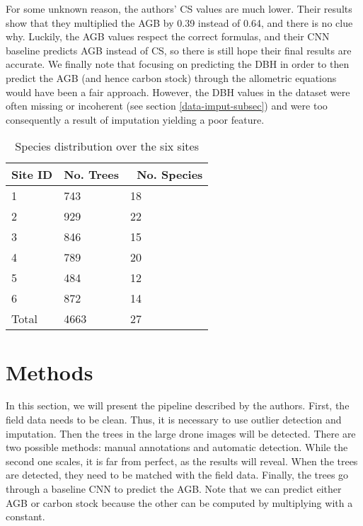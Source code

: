 \documentclass[10pt,twocolumn,letterpaper]{article}
\begin{document}
For some unknown reason, the authors' CS values are much lower. Their results show that they multiplied the AGB by 0.39 instead of 0.64, and there is no clue why. Luckily, the AGB values respect the correct formulas, and their CNN baseline predicts AGB instead of CS, so there is still hope their final results are accurate. We finally note that focusing on predicting the DBH in order to then predict the AGB (and hence carbon stock) through the allometric equations would have been a fair approach. However, the DBH values in the dataset were often missing or incoherent (see section \ref{data-imput-subsec}) and were too consequently a result of imputation yielding a poor feature. 

\begin{table}
    \begin{center}
        \begin{tabular}{P{1cm} | P{1.5cm} | P{1.8cm}}
             Site ID & No. Trees & \ No. Species\\
              & 743 & 18\\
             2 & 929 & 22\\
             3 & 846 & 15\\
             4 & 789 & 20\\
             5 & 484 & 12\\
             6 & 872 & 14\\
             \hline
             Total & 4663 & 27
        \end{tabular}
        \caption{\label{tab:species_distribution}
        Species distribution over the six sites}
    \end{center}
\end{table}

\section{Methods}
\label{sec:method}
In this section, we will present the pipeline described by the authors. First, the field data needs to be clean. Thus, it is necessary to use outlier detection and imputation. Then the trees in the large drone images will be detected. There are two possible methods: manual annotations and automatic detection. While the second one scales, it is far from perfect, as the results will reveal. When the trees are detected, they need to be matched with the field data. Finally, the trees go through a baseline CNN to predict the AGB. Note that we can predict either AGB or carbon stock because the other can be computed by multiplying with a constant.
\end{document}
